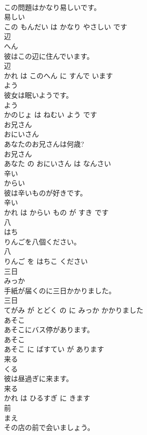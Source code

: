 \documentclass[8pt]{extreport}
\begin{document}
\begin{CJK}{UTF8}{min}
\\	この問題はかなり易しいです。	
\\	易しい 
\\	この もんだい は かなり やさしい です			
\\	辺	
\\	へん			
\\	彼はこの辺に住んでいます。	
\\	辺 
\\	かれ は このへん に すんで います			
\\	よう	
\\	彼女は眠いようです。	
\\	よう 
\\	かのじょ は ねむい よう です			
\\	お兄さん	
\\	おにいさん			
\\	あなたのお兄さんは何歳?	
\\	お兄さん 
\\	あなた の おにいさん は なんさい			
\\	辛い	
\\	からい			
\\	彼は辛いものが好きです。	
\\	辛い 
\\	かれ は からい もの が すき です			
\\	八	
\\	はち			
\\	りんごを八個ください。	
\\	八 
\\	りんご を はちこ ください			
\\	三日	
\\	みっか			
\\	手紙が届くのに三日かかりました。	
\\	三日 
\\	てがみ が とどく の に みっか かかりました			
\\	あそこ	
\\	あそこにバス停があります。	
\\	あそこ 
\\	あそこ に ばすてい が あります			
\\	来る	
\\	くる			
\\	彼は昼過ぎに来ます。	
\\	来る 
\\	かれ は ひるすぎ に きます			
\\	前	
\\	まえ			
\\	その店の前で会いましょう。	

\end{CJK}
\end{document}
